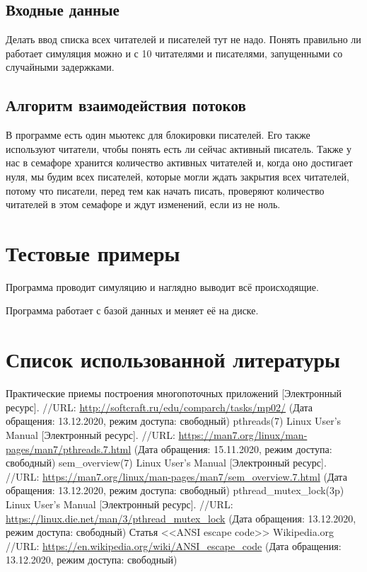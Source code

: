 \documentclass[a4paper]{article}
\begin{document}
  \subsection{Входные данные}
  Делать ввод списка всех читателей и писателей тут не надо.
  Понять правильно ли работает симуляция можно и с 10 читателями и писателями, запущенными со случайными задержками.

  \subsection{Алгоритм взаимодействия потоков}
  В программе есть один мьютекс для блокировки писателей.
  Его также используют читатели, чтобы понять есть ли сейчас активный писатель.
  Также у нас в семафоре хранится количество активных читателей и, когда оно достигает нуля, мы будим всех писателей,
  которые могли ждать закрытия всех читателей, потому что писатели, перед тем как начать писать,
  проверяют количество читателей в этом семафоре и ждут изменений, если из не ноль.

  \newpage
  \section{Тестовые примеры}
  Программа проводит симуляцию и наглядно выводит всё происходящие.

  Программа работает с базой данных и меняет её на диске.

  \newpage
  \section{Список использованной литературы}
  \begin{thebibliography}{3}
     Практические приемы построения многопоточных приложений [Электронный ресурс].
      //URL: \url{http://softcraft.ru/edu/comparch/tasks/mp02/} (Дата обращения: 13.12.2020, режим доступа: свободный)
     pthreads(7) Linux User's Manual [Электронный ресурс].
      //URL: \url{https://man7.org/linux/man-pages/man7/pthreads.7.html} (Дата обращения: 15.11.2020, режим доступа: свободный)
     sem\_overview(7) Linux User's Manual [Электронный ресурс].
    //URL: \url{https://man7.org/linux/man-pages/man7/sem_overview.7.html} (Дата обращения: 13.12.2020, режим доступа: свободный)
     pthread\_mutex\_lock(3p) Linux User's Manual [Электронный ресурс].
      //URL: \url{https://linux.die.net/man/3/pthread_mutex_lock} (Дата обращения: 13.12.2020, режим доступа: свободный)
     Статья <<ANSI escape code>> Wikipedia.org
      //URL: \url{https://en.wikipedia.org/wiki/ANSI_escape_code} (Дата обращения: 13.12.2020, режим доступа: свободный)
  \end{thebibliography}
\end{document}
